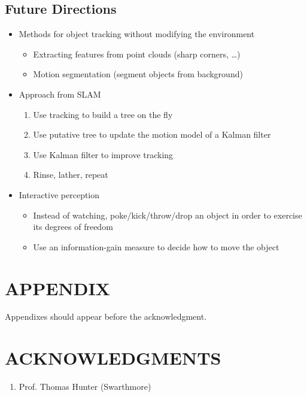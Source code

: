 \documentclass[letterpaper, 10 pt, conference]{ieeeconf}  %
\begin{document}
\subsection{Future Directions}
    \begin{itemize}
      \item Methods for object tracking without modifying the environment
        \begin{itemize}
          \item Extracting features from point clouds (sharp corners, \ldots)
          \item Motion segmentation (segment objects from background)
        \end{itemize}
      \item Approach from SLAM
        \begin{enumerate}
          \item Use tracking to build a tree on the fly
          \item Use putative tree to update the motion model of a Kalman filter
          \item Use Kalman filter to improve tracking
          \item Rinse, lather, repeat
        \end{enumerate}
      \item Interactive perception
        \begin{itemize}
          \item Instead of watching, poke/kick/throw/drop an object in order to exercise its degrees of freedom
          \item Use an information-gain measure to decide how to move the object
        \end{itemize}
    \end{itemize}

\section*{APPENDIX}

Appendixes should appear before the acknowledgment.

\section*{ACKNOWLEDGMENTS}

\begin{enumerate}
  \item Prof. Thomas Hunter (Swarthmore)
\end{enumerate}




\end{document}
